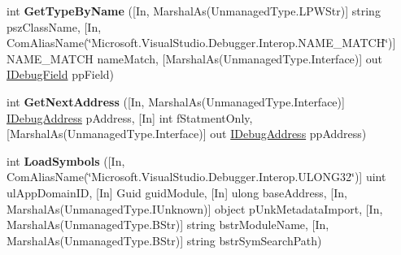 \begin{DoxyCompactItemize}
\item 
\hypertarget{interface_microsoft_1_1_visual_studio_1_1_debugger_1_1_interop_e_e_1_1_i_debug_com_plus_symbol_provider2_a28f9f33b0e03963ed7be436f94ee6311}{int {\bfseries Get\+Type\+By\+Name} (\mbox{[}In, Marshal\+As(Unmanaged\+Type.\+L\+P\+W\+Str)\mbox{]} string psz\+Class\+Name, \mbox{[}In, Com\+Alias\+Name(\char`\"{}Microsoft.\+Visual\+Studio.\+Debugger.\+Interop.\+N\+A\+M\+E\+\_\+\+M\+A\+T\+C\+H\char`\"{})\mbox{]} N\+A\+M\+E\+\_\+\+M\+A\+T\+C\+H name\+Match, \mbox{[}Marshal\+As(Unmanaged\+Type.\+Interface)\mbox{]} out \hyperlink{interface_microsoft_1_1_visual_studio_1_1_debugger_1_1_interop_e_e_1_1_i_debug_field}{I\+Debug\+Field} pp\+Field)}\label{interface_microsoft_1_1_visual_studio_1_1_debugger_1_1_interop_e_e_1_1_i_debug_com_plus_symbol_provider2_a28f9f33b0e03963ed7be436f94ee6311}

\item 
\hypertarget{interface_microsoft_1_1_visual_studio_1_1_debugger_1_1_interop_e_e_1_1_i_debug_com_plus_symbol_provider2_ae6dd464806c094520e50b65d0eaaee9a}{int {\bfseries Get\+Next\+Address} (\mbox{[}In, Marshal\+As(Unmanaged\+Type.\+Interface)\mbox{]} \hyperlink{interface_microsoft_1_1_visual_studio_1_1_debugger_1_1_interop_e_e_1_1_i_debug_address}{I\+Debug\+Address} p\+Address, \mbox{[}In\mbox{]} int f\+Statment\+Only, \mbox{[}Marshal\+As(Unmanaged\+Type.\+Interface)\mbox{]} out \hyperlink{interface_microsoft_1_1_visual_studio_1_1_debugger_1_1_interop_e_e_1_1_i_debug_address}{I\+Debug\+Address} pp\+Address)}\label{interface_microsoft_1_1_visual_studio_1_1_debugger_1_1_interop_e_e_1_1_i_debug_com_plus_symbol_provider2_ae6dd464806c094520e50b65d0eaaee9a}

\item 
\hypertarget{interface_microsoft_1_1_visual_studio_1_1_debugger_1_1_interop_e_e_1_1_i_debug_com_plus_symbol_provider2_ab56b1d1db16145b12c2f591b6bdca11b}{int {\bfseries Load\+Symbols} (\mbox{[}In, Com\+Alias\+Name(\char`\"{}Microsoft.\+Visual\+Studio.\+Debugger.\+Interop.\+U\+L\+O\+N\+G32\char`\"{})\mbox{]} uint ul\+App\+Domain\+I\+D, \mbox{[}In\mbox{]} Guid guid\+Module, \mbox{[}In\mbox{]} ulong base\+Address, \mbox{[}In, Marshal\+As(Unmanaged\+Type.\+I\+Unknown)\mbox{]} object p\+Unk\+Metadata\+Import, \mbox{[}In, Marshal\+As(Unmanaged\+Type.\+B\+Str)\mbox{]} string bstr\+Module\+Name, \mbox{[}In, Marshal\+As(Unmanaged\+Type.\+B\+Str)\mbox{]} string bstr\+Sym\+Search\+Path)}\label{interface_microsoft_1_1_visual_studio_1_1_debugger_1_1_interop_e_e_1_1_i_debug_com_plus_symbol_provider2_ab56b1d1db16145b12c2f591b6bdca11b}


\end{DoxyCompactItemize}

